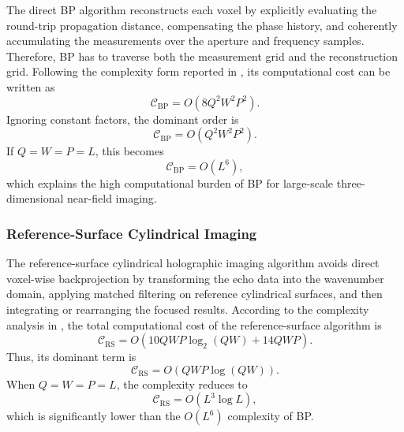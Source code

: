 \documentclass[journal]{IEEEtran}
\begin{document}
The direct BP algorithm reconstructs each voxel by explicitly evaluating the round-trip propagation distance, compensating the phase history, and coherently accumulating the measurements over the aperture and frequency samples. Therefore, BP has to traverse both the measurement grid and the reconstruction grid. Following the complexity form reported in \cite{Tan}, its computational cost can be written as
\begin{equation}
    \mathcal{C}_{\mathrm{BP}}
    = O\left(8Q^2W^2P^2\right).
\end{equation}
Ignoring constant factors, the dominant order is
\begin{equation}
    \mathcal{C}_{\mathrm{BP}}
    = O\left(Q^2W^2P^2\right).
\end{equation}
If $Q=W=P=L$, this becomes
\begin{equation}
    \mathcal{C}_{\mathrm{BP}} = O\left(L^6\right),
\end{equation}
which explains the high computational burden of BP for large-scale three-dimensional near-field imaging.

\subsubsection{Reference-Surface Cylindrical Imaging}

The reference-surface cylindrical holographic imaging algorithm avoids direct voxel-wise backprojection by transforming the echo data into the wavenumber domain, applying matched filtering on reference cylindrical surfaces, and then integrating or rearranging the focused results. According to the complexity analysis in \cite{Tan}, the total computational cost of the reference-surface algorithm is
\begin{equation}
    \mathcal{C}_{\mathrm{RS}}
    = O\left(10QWP\log_2(QW)+14QWP\right).
\end{equation}
Thus, its dominant term is
\begin{equation}
    \mathcal{C}_{\mathrm{RS}}
    = O\left(QWP\log(QW)\right).
\end{equation}
When $Q=W=P=L$, the complexity reduces to
\begin{equation}
    \mathcal{C}_{\mathrm{RS}}
    = O\left(L^3\log L\right),
\end{equation}
which is significantly lower than the $O(L^6)$ complexity of BP.
\end{document}
